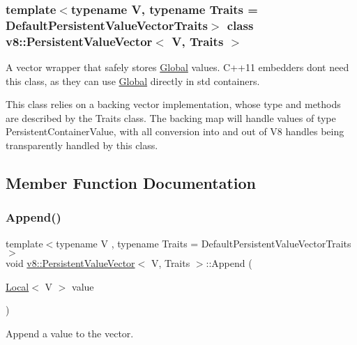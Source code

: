 \subsubsection*{template$<$typename V, typename Traits = Default\+Persistent\+Value\+Vector\+Traits$>$\newline
class v8\+::\+Persistent\+Value\+Vector$<$ V, Traits $>$}

A vector wrapper that safely stores \mbox{\hyperlink{classv8_1_1Global}{Global}} values. C++11 embedders don\textquotesingle{}t need this class, as they can use \mbox{\hyperlink{classv8_1_1Global}{Global}} directly in std containers.

This class relies on a backing vector implementation, whose type and methods are described by the Traits class. The backing map will handle values of type Persistent\+Container\+Value, with all conversion into and out of V8 handles being transparently handled by this class. 

\subsection{Member Function Documentation}
\mbox{\label{classv8_1_1PersistentValueVector_a02376c6d16be29084db46f65473477fb}} 
\subsubsection{\texorpdfstring{Append()}{Append()}\hspace{0.1cm}{\footnotesize\ttfamily [1/2]}}
{\footnotesize\ttfamily template$<$typename V , typename Traits  = Default\+Persistent\+Value\+Vector\+Traits$>$ \\
void \mbox{\hyperlink{classv8_1_1PersistentValueVector}{v8\+::\+Persistent\+Value\+Vector}}$<$ V, Traits $>$\+::Append (\begin{DoxyParamCaption}\item[{\mbox{\hyperlink{classv8_1_1Local}{Local}}$<$ V $>$}]{value }\end{DoxyParamCaption})\hspace{0.3cm}{\ttfamily [inline]}}

Append a value to the vector. \mbox{\label{classv8_1_1PersistentValueVector_ad076923fd0046196670e87e996582546}} 
